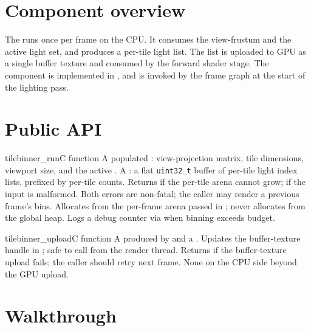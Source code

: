 \documentclass[11pt]{article}
\begin{document}
\makedoctocpage

\section{Component overview}
The  runs once per frame on the CPU. It consumes
the view-frustum and the active light set, and produces a per-tile
light list. The list is uploaded to GPU as a single buffer texture
and consumed by the forward shader stage. The component is
implemented in ,
and is invoked by the frame graph at the start of the lighting pass.

\section{Public API}

\begin{apicontract}{tilebinner\_run}{C function}
  \Inputs A populated : view-projection matrix,
          tile dimensions, viewport size, and the active
          .
  \Outputs A : a flat \texttt{uint32\_t} buffer
          of per-tile light index lists, prefixed by per-tile counts.
  \Errors  Returns  if the per-tile arena cannot
           grow;  if the input is malformed.
           Both errors are non-fatal; the caller may render a previous
           frame's bins.
  \SideEffects Allocates from the per-frame arena passed in
           ; never allocates from the
           global heap. Logs a debug counter via
            when binning exceeds budget.
\end{apicontract}

\begin{apicontract}{tilebinner\_upload}{C function}
  \Inputs A  produced by
           and a .
  \Outputs Updates the buffer-texture handle in
          ; safe to call
          from the render thread.
  \Errors  Returns  if the buffer-texture
           upload fails; the caller should retry next frame.
  \SideEffects None on the CPU side beyond the GPU upload.
\end{apicontract}

\section{Walkthrough}
\end{document}
